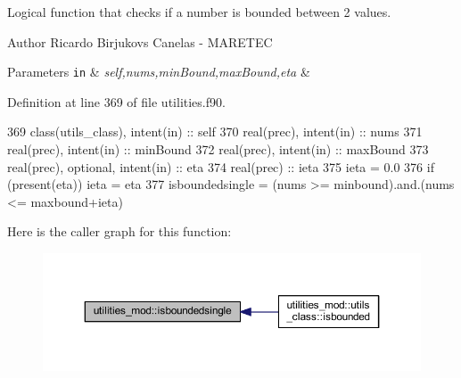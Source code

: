 Logical function that checks if a number is bounded between 2 values. 

\begin{DoxyAuthor}{Author}
Ricardo Birjukovs Canelas -\/ M\+A\+R\+E\+T\+EC 
\end{DoxyAuthor}

\begin{DoxyParams}[1]{Parameters}
\mbox{\tt in}  & {\em self,nums,min\+Bound,max\+Bound,eta} & \\
\hline
\end{DoxyParams}


Definition at line 369 of file utilities.\+f90.


\begin{DoxyCode}
369     \textcolor{keywordtype}{class}(utils\_class), \textcolor{keywordtype}{intent(in)} :: self
370     \textcolor{keywordtype}{real(prec)}, \textcolor{keywordtype}{intent(in)} :: nums
371     \textcolor{keywordtype}{real(prec)}, \textcolor{keywordtype}{intent(in)} :: minBound
372     \textcolor{keywordtype}{real(prec)}, \textcolor{keywordtype}{intent(in)} :: maxBound
373     \textcolor{keywordtype}{real(prec)}, \textcolor{keywordtype}{optional}, \textcolor{keywordtype}{intent(in)} :: eta
374     \textcolor{keywordtype}{real(prec)} :: ieta
375     ieta = 0.0
376     \textcolor{keywordflow}{if} (\textcolor{keyword}{present}(eta)) ieta = eta
377     isboundedsingle = (nums >= minbound).and.(nums <= maxbound+ieta)
\end{DoxyCode}
Here is the caller graph for this function\+:\nopagebreak
\begin{figure}[H]
\begin{center}
\leavevmode
\includegraphics[width=350pt]{namespaceutilities__mod_a258d85bcc477041275bd954667168ea3_icgraph}
\end{center}
\end{figure}
\mbox{\label{namespaceutilities__mod_ae6b8a45b229e3f1f8c2b12dd74e7a2dd}} 
